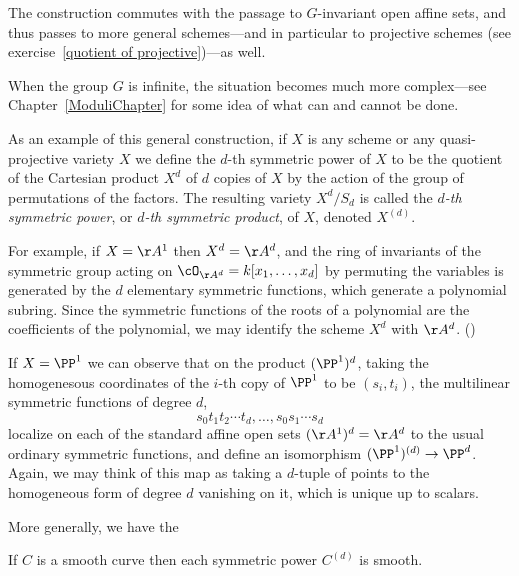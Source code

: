 The construction commutes with the passage to $G$-invariant open affine sets, and thus passes to more general schemes---and in particular to projective schemes (see exercise~\ref{quotient of projective})---as well.

When the group $G$ is infinite, the situation becomes much more complex---see Chapter~\ref{ModuliChapter} for some  idea of what can and cannot be done.

As an example of this general construction, if $X$ is any scheme or any quasi-projective variety $X$ we define the $d$-th symmetric power of $X$ to be the quotient of the Cartesian product $X^d$ of $d$ copies of $X$ by the action of the group of permutations of the factors. The resulting variety $X^d/S_d$ is called the \emph{$d$-th symmetric power}, or \emph{$d$-th symmetric product}, of $X$, denoted  $X^{(d)}$. 


For example, if $X=\AA^{1}$ then $X^{d} = \AA^{d}$, and the ring of invariants of the symmetric group acting on
$\cO_{\AA^{d}} = k[x_{1}, \dots, x_{d}]$ by permuting the variables is generated by the $d$ elementary symmetric functions, which generate a polynomial subring. Since the symmetric functions of the roots of a polynomial are the coefficients of
the polynomial, we may identify the scheme $X^{d}$ with $\AA^{d}$. (\cite[Exercises 1.6, 13.2-13.4]{Eisenbud1995})

If $X = \PP^1$ we can observe that on the product $(\PP^1)^d$, taking the homogenesous coordinates of the
$i$-th copy of $\PP^1$ to be $(s_i,t_i)$, the multilinear symmetric functions of degree $d$,
$$
s_0t_1t_2\cdots t_d,\dots,s_0s_1\cdots s_d
$$
localize on each of the standard affine open sets $(\AA^1)^d=\AA^d$ to the usual ordinary symmetric functions, and define
an isomorphism $(\PP^1)^{(d)} \to \PP^d$.
Again, we may think of this map as taking a $d$-tuple of points to the
homogeneous form of degree $d$ vanishing on it, which is unique up to scalars.

More generally, we have the

\begin{proposition}
If $C$ is a smooth curve then each symmetric power $C^{(d)}$ is smooth.
\end{proposition}


